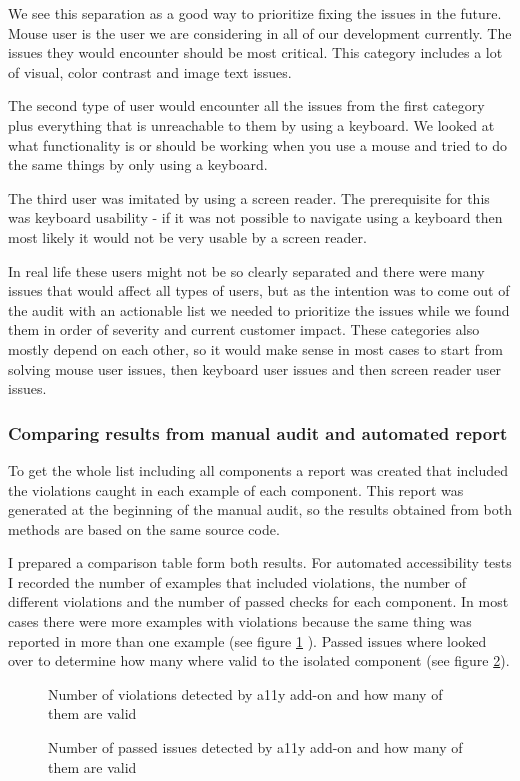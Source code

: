 \documentclass{master_thesis}
\begin{document}
We see this separation as a good way to prioritize  fixing the issues in the future. Mouse user is the user we are considering in all of our development currently. The issues they would encounter should be most critical. This category includes a lot of visual, color contrast and image text issues.

The second type of user would encounter all the issues from the first category plus everything that is unreachable to them by using a keyboard. We looked at what functionality is or should be working when you use a mouse and tried to do the same things by only using a keyboard.

The third user was imitated by using a screen reader. The prerequisite for this was keyboard usability - if it was not possible to navigate using a keyboard then most likely it would not be very usable by a screen reader.

In real life these users might not be so clearly separated and there were many issues that would affect all types of users, but as the intention was to come out of the audit with an actionable list we needed to prioritize the issues while we found them in order of severity and current customer impact. These categories also mostly depend on each other, so it would make sense in most cases to start from solving mouse user issues, then keyboard user issues and then screen reader user issues.

\subsubsection{Comparing results from manual audit and automated report}

To get the whole list including all components a report was created that included the violations caught in each example of each component. This report was generated at the beginning of the manual audit, so the results obtained from both methods are based on the same source code.

I prepared a comparison table form both results. For automated accessibility tests I recorded the number of examples that included violations, the number of different violations and the number of passed checks for each component. In most cases there were more examples with violations because the same thing was reported in more than one example (see figure \ref{fig:audit-fail} ). Passed issues where looked over to determine how many where valid to the isolated component (see figure \ref{fig:audit-pass}).
\begin{figure}[h]
	\caption{Number of violations detected by a11y add-on and how many of them are valid}
	\label{fig:audit-fail}
\end{figure}
\begin{figure}[h]
	\caption{Number of passed issues detected by a11y add-on and how many of them are valid}
	\label{fig:audit-pass}
\end{figure}
\end{document}
